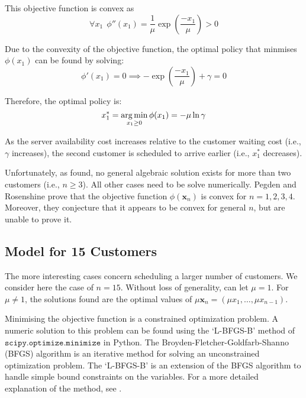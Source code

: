 This objective function is convex as
\begin{equation}
	\forall x_{1} \ \ \phi'' (x_{1}) = \frac{1}{\mu} \exp \left( \frac{- x_{1}}{\mu} \right) > 0
\end{equation}

Due to the convexity of the objective function, the optimal policy that minmises $\phi (x_{1})$ can be found by solving:
\begin{equation}
	\phi' (x_{1}) = 0 \implies - \exp \left( \frac{- x_{1}}{\mu} \right) + \gamma = 0
\end{equation}

Therefore, the optimal policy is:
\begin{equation}
	x_{1}^{*} = \operatorname*{arg\,min}_{x_{1} \geq 0} \phi (x_{1}) = - \mu \ln \gamma
\end{equation}

As the server availability cost increases relative to the customer waiting cost (i.e., $\gamma$ increases), the second customer is scheduled to arrive earlier (i.e., $x_{1}^{*}$ decreases).

Unfortunately, as \citet{Pegden} found, no general algebraic solution exists for more than two customers (i.e., $n \geq 3$). All other cases need to be solve numerically. Pegden and Rosenshine prove that the objective function $\phi (\mathbf{x}_{n})$ is convex for $n = 1, 2, 3, 4$. Moreover, they conjecture that it appears to be convex for general $n$, but are unable to prove it.

\subsection{Model for 15 Customers}
The more interesting cases concern scheduling a larger number of customers. We consider here the case of $n = 15$. Without loss of generality, can let $\mu = 1$. For $\mu \neq 1$, the solutions found are the optimal values of $\mu \mathbf{x}_{n} = (\mu x_{1}, \ldots, \mu x_{n - 1})$.

Minimising the objective function is a constrained optimization problem. A numeric solution to this problem can be found using the `L-BFGS-B' method of \newline $\texttt{scipy.optimize.minimize}$ in Python. The Broyden-Fletcher-Goldfarb-Shanno (BFGS) algorithm is an iterative method for solving an unconstrained optimization problem. The `L-BFGS-B' is an extension of the BFGS algorithm to handle simple bound constraints on the variables. For a more detailed explanation of the method, see \citet{Byrd}.

